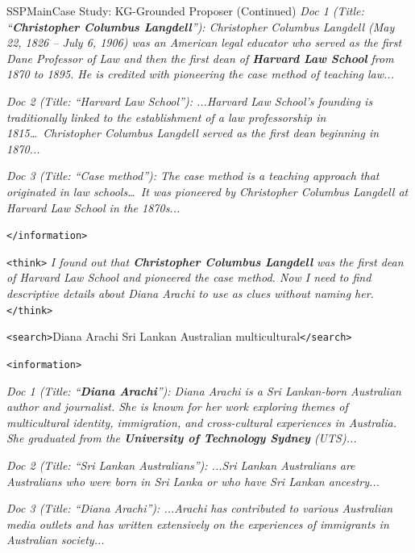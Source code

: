 \begin{casepagebox}{SSPMain}{Case Study: KG-Grounded Proposer (Continued)}
\textit{Doc 1 (Title: ``\colorbox{yellow!30}{\textbf{Christopher Columbus Langdell}}''): Christopher Columbus Langdell (May 22, 1826 -- July 6, 1906) was an American legal educator who served as the first Dane Professor of Law and then the first dean of \colorbox{yellow!30}{\textbf{Harvard Law School}} from 1870 to 1895. He is credited with pioneering the case method of teaching law...}

\textit{Doc 2 (Title: ``Harvard Law School''): ...Harvard Law School's founding is traditionally linked to the establishment of a law professorship in 1815\ldots\ Christopher Columbus Langdell served as the first dean beginning in 1870...}

\textit{Doc 3 (Title: ``Case method''): The case method is a teaching approach that originated in law schools\ldots\ It was pioneered by Christopher Columbus Langdell at Harvard Law School in the 1870s...}

\textcolor{TagInfo}{\texttt{</information>}}
\vspace{3mm}

\begin{thinkpanel}
\textcolor{TagThink}{\texttt{<think>}} \textit{I found out that \colorbox{yellow!30}{\textbf{Christopher Columbus Langdell}} was the first dean of Harvard Law School and pioneered the case method. Now I need to find descriptive details about Diana Arachi to use as clues without naming her.} \textcolor{TagThink}{\texttt{</think>}}
\end{thinkpanel}

\textcolor{TagSearch}{\texttt{<search>}}Diana Arachi Sri Lankan Australian multicultural\textcolor{TagSearch}{\texttt{</search>}}

\textcolor{TagInfo}{\texttt{<information>}}

\textit{Doc 1 (Title: ``\colorbox{yellow!30}{\textbf{Diana Arachi}}''): Diana Arachi is a Sri Lankan-born Australian author and journalist. She is known for her work exploring themes of multicultural identity, immigration, and cross-cultural experiences in Australia. She graduated from the \colorbox{yellow!30}{\textbf{University of Technology Sydney}} (UTS)...}

\textit{Doc 2 (Title: ``Sri Lankan Australians''): ...Sri Lankan Australians are Australians who were born in Sri Lanka or who have Sri Lankan ancestry...}

\textit{Doc 3 (Title: ``Diana Arachi''): ...Arachi has contributed to various Australian media outlets and has written extensively on the experiences of immigrants in Australian society...}


\end{casepagebox}
